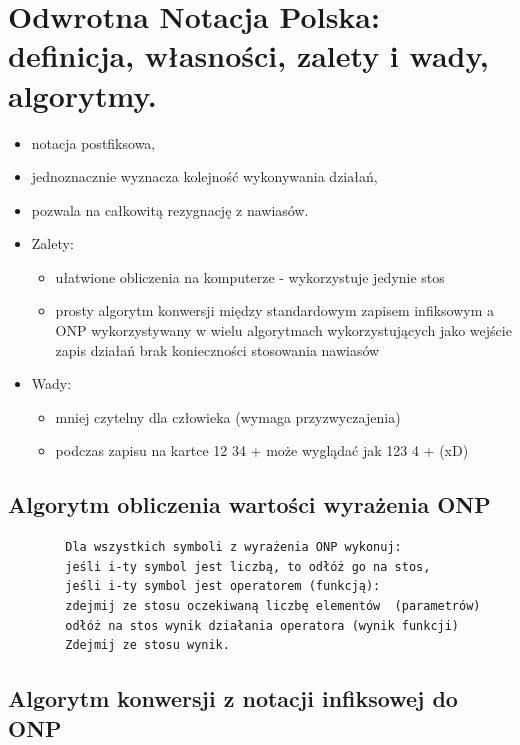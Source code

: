 \documentclass[12pt]{article}
\begin{document}
    \newpage
    \section{Odwrotna Notacja Polska: definicja, własności, zalety i wady, algorytmy.}

    \begin{itemize}
        \item notacja postfiksowa,
        \item jednoznacznie wyznacza kolejność wykonywania działań,
        \item pozwala na całkowitą rezygnację z nawiasów.
        \item Zalety:
        \begin{itemize}
            \item ułatwione obliczenia na komputerze - wykorzystuje jedynie stos
            \item prosty algorytm konwersji między standardowym zapisem infiksowym a ONP
            wykorzystywany w wielu algorytmach wykorzystujących jako wejście zapis działań
            brak konieczności stosowania nawiasów
        \end{itemize}
        \item Wady:
        \begin{itemize}
            \item mniej czytelny dla człowieka (wymaga przyzwyczajenia)
            \item podczas zapisu na kartce 12 34 + może wyglądać jak 123 4 + (xD)
        \end{itemize}
    \end{itemize}

    \subsection{Algorytm obliczenia wartości wyrażenia ONP}
    \begin{verbatim}
        Dla wszystkich symboli z wyrażenia ONP wykonuj:
        jeśli i-ty symbol jest liczbą, to odłóż go na stos,
        jeśli i-ty symbol jest operatorem (funkcją):
        zdejmij ze stosu oczekiwaną liczbę elementów  (parametrów)
        odłóż na stos wynik działania operatora (wynik funkcji)
        Zdejmij ze stosu wynik.
    \end{verbatim}

    \subsection{Algorytm konwersji z notacji infiksowej do ONP}
\end{document}
